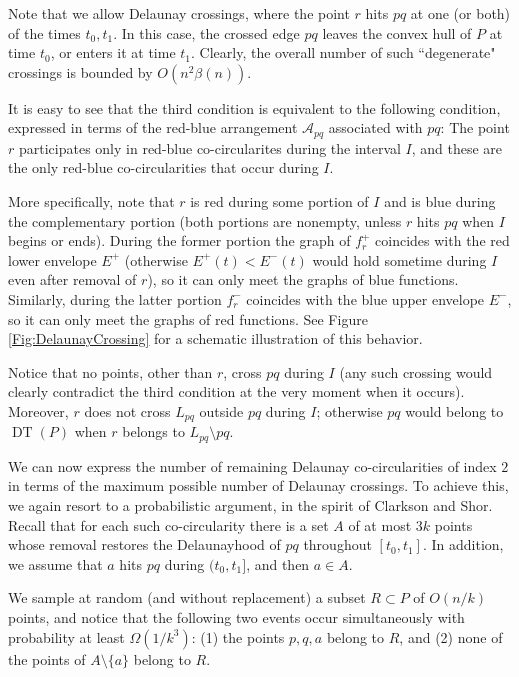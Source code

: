 \documentclass[letter,11pt]{article}
\def\A{\mathcal{A}}
\def \L{{L}}
\def\DT{\mathop{\mathrm{DT}}}
\begin{document}
Note that we allow Delaunay crossings, where the point $r$ hits $pq$ at one (or both) of the times $t_0,t_1$. In this case, the crossed edge $pq$ leaves the convex hull of $P$ at time $t_0$, or enters it at time $t_1$. Clearly, the overall number of such ``degenerate" crossings is bounded by $O(n^2\beta(n))$.

It is easy to see that the third condition is equivalent to the following condition, expressed in terms of the red-blue arrangement $\A_{pq}$ associated with $pq$: The point $r$ participates only in red-blue co-circularites during the interval $I$, and these are the only red-blue co-circularities that occur during $I$.

More specifically, note that $r$ is red during some portion of $I$ and is blue during the complementary portion (both portions are nonempty, unless $r$ hits $pq$ when $I$ begins or ends). During the former portion the graph of $f_r^+$ coincides with the red lower envelope $E^+$ (otherwise $E^+(t)<E^-(t)$ would hold sometime during $I$ even after removal of $r$), so it can only meet the graphs of blue functions. Similarly, during the latter portion $f_r^-$ coincides with the blue upper envelope $E^-$, so it can only meet the graphs of red functions.
See Figure \ref{Fig:DelaunayCrossing} for a schematic illustration of this behavior.

Notice that no points, other than $r$, cross $pq$ during $I$ (any such crossing would clearly contradict the third condition at the very moment when it occurs).
Moreover, $r$ does not cross $\L_{pq}$ outside $pq$ during $I$; otherwise $pq$ would belong to $\DT(P)$ when $r$ belongs to $\L_{pq}\setminus pq$.






\medskip
{} We can now express the number of remaining Delaunay co-circularities of index $2$ in terms of the maximum possible number of Delaunay crossings. To achieve this, we again resort to a probabilistic argument, in the spirit of Clarkson and Shor. Recall that for each such co-circularity there is a set $A$ of at most $3k$ points whose removal restores the Delaunayhood of $pq$ throughout $[t_0,t_1]$. In addition, we assume that $a$ hits $pq$ during $(t_0,t_1]$, and then $a\in A$.

We sample at random (and without replacement) a subset $R\subset P$ of $O(n/k)$ points, and notice that the following two events occur simultaneously with probability at least $\Omega(1/k^3)$: (1) the points $p,q,a$ belong to $R$, and (2) none of the points of $A\setminus\{a\}$ belong to $R$. 
\end{document}
